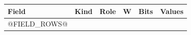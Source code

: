 \par\noindent
\begin{tabularx}{\linewidth}{@{}>{\raggedright\arraybackslash}p{0.28in}>{\raggedright\arraybackslash}p{0.52in}>{\raggedright\arraybackslash}p{0.80in}>{\raggedright\arraybackslash}p{0.36in}>{\raggedright\arraybackslash}p{0.52in}>{\raggedright\arraybackslash}X@{}}
\textbf{Field} & \textbf{Kind} & \textbf{Role} & \textbf{W} & \textbf{Bits} & \textbf{Values}\\
\midrule
@FIELD_ROWS@
\end{tabularx}\par
